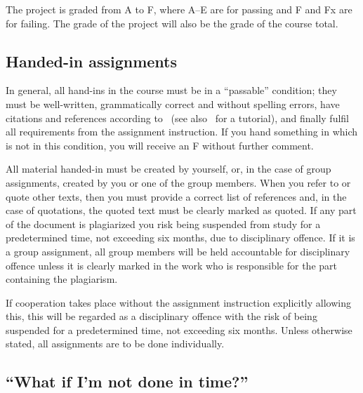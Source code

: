 The project is graded from A to F, where A--E are for passing and F and Fx are 
for failing.
The grade of the project will also be the grade of the course total.

\subsection{Handed-in assignments}


In general, all hand-ins in the course must be in a \enquote{passable} 
condition; \ie they must be well-written, grammatically correct and without 
spelling errors, have citations and references according to~\cite{IEEEcitation} 
(see also~\cite{PurdueCitation} for a tutorial), and finally fulfil all 
requirements from the assignment instruction.
If you hand something in which is not in this condition, you will receive an 
F without further comment.

All material handed-in must be created by yourself, or, in the case of group 
assignments, created by you or one of the group members.
When you refer to or quote other texts, then you must provide a correct list of 
references and, in the case of quotations, the quoted text must be clearly 
marked as quoted.
If any part of the document is plagiarized you risk being suspended from study 
for a predetermined time, not exceeding six months, due to disciplinary 
offence.
If it is a group assignment, all group members will be held accountable for 
disciplinary offence unless it is clearly marked in the work who is responsible 
for the part containing the plagiarism.

If cooperation takes place without the assignment instruction explicitly 
allowing this, this will be regarded as a disciplinary offence with the risk of
being suspended for a predetermined time, not exceeding six months.
Unless otherwise stated, all assignments are to be done individually.

\subsection{\enquote{What if I'm not done in time?}}%
\label{sec:late}



\printbibliography{}
